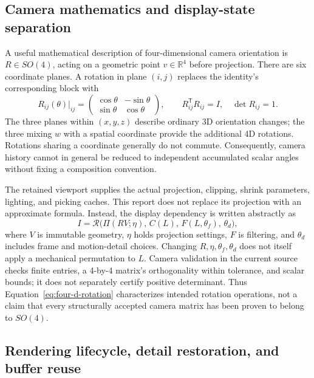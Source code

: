 \documentclass[a4paper,11pt]{article}
\begin{document}
\subsection{Camera mathematics and display-state separation}

A useful mathematical description of four-dimensional camera orientation is \(R\in SO(4)\), acting on a geometric point \(v\in\mathbb R^4\) before projection. There are six coordinate planes. A rotation in plane \((i,j)\) replaces the identity's corresponding block with
\begin{equation}
R_{ij}(\theta)\big|_{ij}=
\begin{pmatrix}\cos\theta&-\sin\theta\\\sin\theta&\cos\theta\end{pmatrix},
\qquad R_{ij}^{\mathsf T}R_{ij}=I,\quad\det R_{ij}=1.
\label{eq:four-d-rotation}
\end{equation}
The three planes within \((x,y,z)\) describe ordinary 3D orientation changes; the three mixing \(w\) with a spatial coordinate provide the additional 4D rotations. Rotations sharing a coordinate generally do not commute. Consequently, camera history cannot in general be reduced to independent accumulated scalar angles without fixing a composition convention.

The retained viewport supplies the actual projection, clipping, shrink parameters, lighting, and picking caches. This report does not replace its projection with an approximate formula. Instead, the display dependency is written abstractly as
\begin{equation}
I=\mathcal R\bigl(\Pi(RV;\eta),\,C(L),\,F(L,\theta_f),\,\theta_d\bigr),
\label{eq:render-dependency}
\end{equation}
where \(V\) is immutable geometry, \(\eta\) holds projection settings, \(F\) is filtering, and \(\theta_d\) includes frame and motion-detail choices. Changing \(R,\eta,\theta_f,\theta_d\) does not itself apply a mechanical permutation to \(L\). Camera validation in the current source checks finite entries, a 4-by-4 matrix's orthogonality within tolerance, and scalar bounds; it does not separately certify positive determinant. Thus Equation~\eqref{eq:four-d-rotation} characterizes intended rotation operations, not a claim that every structurally accepted camera matrix has been proven to belong to \(SO(4)\).

\subsection{Rendering lifecycle, detail restoration, and buffer reuse}
\end{document}
